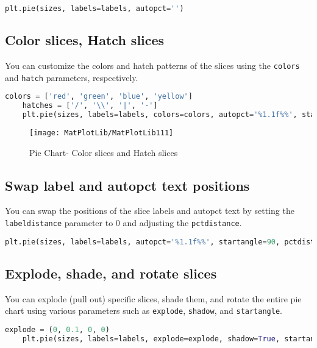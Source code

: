 \begin{lstlisting}[language=Python]
	plt.pie(sizes, labels=labels, autopct='')
\end{lstlisting}

\subsection*{Color slices, Hatch slices}

You can customize the colors and hatch patterns of the slices using the \texttt{colors} and \texttt{hatch} parameters, respectively.

\begin{lstlisting}[language=Python]
	colors = ['red', 'green', 'blue', 'yellow']
	hatches = ['/', '\\', '|', '-']
	plt.pie(sizes, labels=labels, colors=colors, autopct='%1.1f%%', startangle=90, pctdistance=0.85, explode=(0, 0.1, 0, 0))
\end{lstlisting}


\begin{figure}[h]
	\centering
	\texttt{[image: MatPlotLib/MatPlotLib111]}
	\caption{Pie Chart- Color slices and Hatch slices}\label{Matplotlib111}
\end{figure}

\subsection*{Swap label and autopct text positions}

You can swap the positions of the slice labels and autopct text by setting the \texttt{labeldistance} parameter to 0 and adjusting the \texttt{pctdistance}.

\begin{lstlisting}[language=Python]
	plt.pie(sizes, labels=labels, autopct='%1.1f%%', startangle=90, pctdistance=0.5, labeldistance=0.75)
\end{lstlisting}

\subsection*{Explode, shade, and rotate slices}

You can explode (pull out) specific slices, shade them, and rotate the entire pie chart using various parameters such as \texttt{explode}, \texttt{shadow}, and \texttt{startangle}.

\begin{lstlisting}[language=Python]
	explode = (0, 0.1, 0, 0)
	plt.pie(sizes, labels=labels, explode=explode, shadow=True, startangle=90)
\end{lstlisting}

